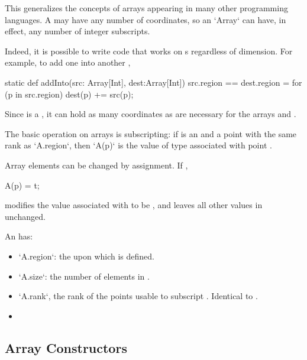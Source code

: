 This generalizes the concepts of arrays appearing in many other programming
languages.  A  may have any number of coordinates, so an
\xcd`Array` can have, in effect, any number of integer subscripts.  

Indeed, it is possible to write code that works on s regardless 
of dimension.  For example, to add one   into another
, 
\begin{xten}
static def addInto(src: Array[Int], dest:Array[Int])
  {src.region == dest.region}
  = {
    for (p in src.region) 
       dest(p) += src(p);
  }
\end{xten}
\noindent
Since  is a , it can hold as many coordinates as are
necessary for the arrays  and .

The basic operation on arrays is subscripting: if  is an 
and  a point with the same rank as \xcd`A.region`, then
\xcd`A(p)`
is the value of type  associated with point .

Array elements can be changed by assignment. If , 
\begin{xten}
A(p) = t;
\end{xten}
modifies the value associated with  to be , and leaves all other
values in  unchanged.

An   has: 
\begin{itemize}
\item \xcd`A.region`: the  upon which  is defined.
\item \xcd`A.size`: the number of elements in .
\item \xcd`A.rank`, the rank of the points usable to subscript .
      Identical to .
\item 
\end{itemize}

\subsection{Array Constructors}

